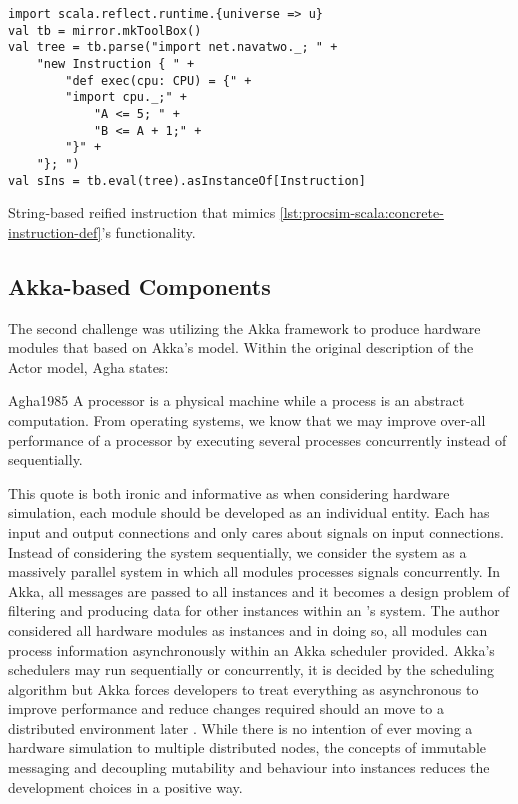 \begin{listing}[h!]
\begin{verbatim}
import scala.reflect.runtime.{universe => u}
val tb = mirror.mkToolBox()
val tree = tb.parse("import net.navatwo._; " +
    "new Instruction { " +
        "def exec(cpu: CPU) = {" +
        "import cpu._;" +
            "A <= 5; " +
            "B <= A + 1;" +
        "}" +
    "}; ")
val sIns = tb.eval(tree).asInstanceOf[Instruction]
\end{verbatim}
\caption{String-based reified instruction that mimics \cref{lst:procsim-scala:concrete-instruction-def}'s functionality.}
\label{lst:procsim-scala:reify-instruction-def}
\end{listing}

\subsection{Akka-based Components}

The second challenge was utilizing the Akka framework to produce hardware modules that based on Akka's \akkaActor{} model. Within the original description of the Actor model, Agha states:
\begin{displaycquote}{Agha1985}
    A processor is a physical machine while a process is an abstract computation. From operating systems, we know that we may improve over-all performance of a processor by executing several processes concurrently instead of sequentially.
\end{displaycquote}
This quote is both ironic and informative as when considering hardware simulation, each module should be developed as an individual entity. Each has input and output connections and only cares about signals on input connections. Instead of considering the system sequentially, we consider the system as a massively parallel system in which all modules processes signals concurrently. In Akka, all messages are passed to all \akkaActor{} instances and it becomes a design problem of filtering and producing data for other \akkaActor{} instances within an \akkaActor's system. The author considered all hardware modules as \akkaActor{} instances and in doing so, all modules can process information asynchronously within an Akka scheduler provided. Akka's schedulers may run sequentially or concurrently, it is decided by the scheduling algorithm but Akka forces developers to treat everything as asynchronous to improve performance and reduce changes required should an \akkaActor{} move to a distributed environment later \cite{TypesafeAkka2015}. While there is no intention of ever moving a hardware simulation to multiple distributed nodes, the concepts of immutable messaging and decoupling mutability and behaviour into \akkaActor{} instances reduces the development choices in a positive way. 

